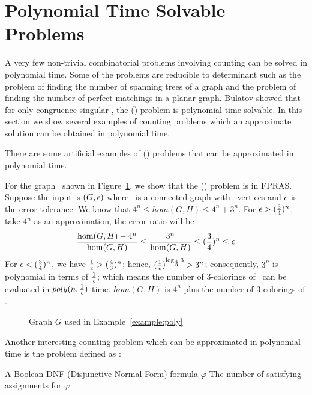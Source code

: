 \section{Polynomial Time Solvable Problems}
A very few non-trivial combinatorial problems involving counting 
can be solved in polynomial time.
Some of the problems are reducible to determinant such as
the problem of finding the number of spanning trees of a graph and 
the problem of finding the number of perfect matchings in a planar graph.
Bulatov \cite{Bulatov} showed that for only congruence singular \mrelset, the \ccsp(\mrelset)
problem  is polynomial time solvable. In this section we show several
examples of counting problems which an approximate solution can be obtained in polynomial time.

There are some artificial examples of \ccsp(\mrelset) problems that can be approximated 
in polynomial time. 

\begin{example} \label{example:poly}
For the graph \mH\ shown in Figure~\ref{fig:approxible},
we show that the \chom(\mH) problem is in FPRAS\@. Suppose the input is 
\((G,\epsilon)\) where \mG\ is a connected graph with \mn\ vertices and \(\epsilon\)
is the error tolerance.
We know that 
\(4^n\le hom(G,H) \le 4^n+3^n\)\@.
For \(\epsilon > (\frac{3}{4})^n\), take \(4^n\) as an approximation, the error ratio will  be
\[\frac{\hom(G,H)-4^n}{\hom(G,H)} \le \frac{3^n}{\hom(G,H)} \le (\frac{3}{4})^n \le \epsilon\]
For \(\epsilon < (\frac{3}{4})^n\), we have \(\frac{1}{\epsilon}>(\frac{4}{3})^n \);
hence, \((\frac{1}{\epsilon})^{\log_{\frac{4}{3}}3} > 3^n\); consequently, \(3^n\) is polynomial 
in terms of \(\frac{1}{\epsilon}\); which means the number of 3-colorings of \mG\ can be evaluated in 
\(poly(n,\frac{1}{\epsilon})\) time. 
\(hom(G,H)\) is \(4^n\) plus the number of 3-colorings of \mG\@.

\begin{figure}[h]
\center
\caption{Graph \ensuremath{G} used in Example~\ref{example:poly}}
\label{fig:approxible}
\end{figure}
\end{example}

Another interesting counting problem which can be approximated in polynomial time is 
the  problem defined as :

\pnndef %
{A Boolean DNF (Disjunctive Normal Form) formula \(\varphi\)}
{The number of satisfying assignments for \(\varphi\)}

